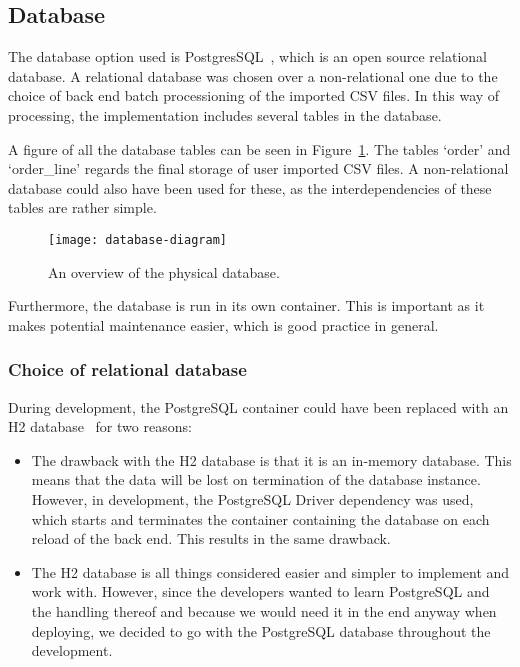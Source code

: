 \subsection{Database}\label{subsec:database}

The database option used is PostgresSQL~\cite{postgresql2024}, which is an open source relational database.
A relational database was chosen over a non-relational one due to the choice of back end batch processioning of the
imported CSV files.
In this way of processing, the implementation includes several tables in the database.

A figure of all the database tables can be seen in Figure~\ref{fig:database-diagram}.
The tables `order' and `order\_line' regards the final storage of user imported CSV files.
A non-relational database could also have been used for these, as the interdependencies of these tables are rather
simple.

\begin{figure}[H]
    \centering
    \texttt{[image: database-diagram]}
    \caption{An overview of the physical database.
    }\label{fig:database-diagram}
\end{figure}

Furthermore, the database is run in its own container.
This is important as it makes potential maintenance easier, which is good practice in general.

\subsubsection{Choice of relational database}\label{subsubsec:choice-of-relational-database}

During development, the PostgreSQL container could have been replaced with
an H2
database~\cite{h22024} for two reasons:

\begin{itemize}
    \item The drawback with the
    H2
    database is that it is an in-memory database.
    This means that the data will be lost on termination of the database instance.
    However, in development, the PostgreSQL Driver dependency was used, which starts and terminates the container
    containing the database on each reload of the back end.
    This results in the same drawback.
    \item The
    H2
    database is all things considered easier and simpler to implement and work with.
    However, since the developers wanted to learn PostgreSQL and the handling thereof and because we would
    need it in the end anyway when deploying, we decided to go with the PostgreSQL database throughout the development.
\end{itemize}
